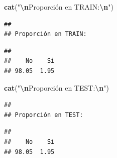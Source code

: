 \documentclass[
]{article}
\newenvironment{Shaded}{\begin{snugshade}}{\end{snugshade}}
\newcommand{\DecValTok}[1]{\textcolor[rgb]{0.00,0.00,0.81}{#1}}
\newcommand{\FunctionTok}[1]{\textcolor[rgb]{0.13,0.29,0.53}{\textbf{#1}}}
\newcommand{\NormalTok}[1]{#1}
\newcommand{\SpecialCharTok}[1]{\textcolor[rgb]{0.81,0.36,0.00}{\textbf{#1}}}
\newcommand{\StringTok}[1]{\textcolor[rgb]{0.31,0.60,0.02}{#1}}
\begin{document}
\begin{Shaded}
\begin{Highlighting}[]
\FunctionTok{cat}\NormalTok{(}\StringTok{"}\SpecialCharTok{\textbackslash{}n}\StringTok{Proporción en TRAIN:}\SpecialCharTok{\textbackslash{}n}\StringTok{"}\NormalTok{)}
\end{Highlighting}
\end{Shaded}

\begin{verbatim}
## 
## Proporción en TRAIN:
\end{verbatim}

\begin{Shaded}
\end{Shaded}

\begin{verbatim}
## 
##    No    Si 
## 98.05  1.95
\end{verbatim}

\begin{Shaded}
\begin{Highlighting}[]
\FunctionTok{cat}\NormalTok{(}\StringTok{"}\SpecialCharTok{\textbackslash{}n}\StringTok{Proporción en TEST:}\SpecialCharTok{\textbackslash{}n}\StringTok{"}\NormalTok{)}
\end{Highlighting}
\end{Shaded}

\begin{verbatim}
## 
## Proporción en TEST:
\end{verbatim}

\begin{Shaded}
\end{Shaded}

\begin{verbatim}
## 
##    No    Si 
## 98.05  1.95
\end{verbatim}
\end{document}
